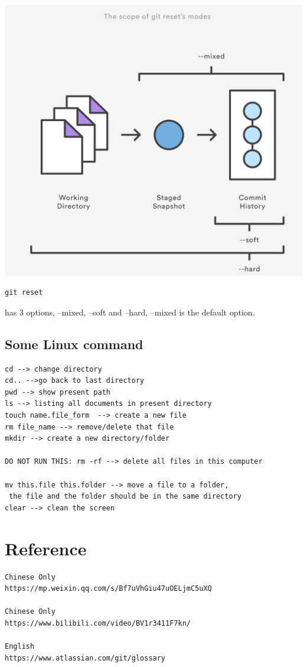 \documentclass[UTF8]{article}
\begin{document}
\begin{center}
\includegraphics[scale=0.3]{gitreset}
\end{center}

\begin{verbatim}
git reset 
\end{verbatim}
has 3 options, --mixed, --soft and --hard, --mixed is the default option. 

\subsection{Some Linux command}
\begin{verbatim}
cd --> change directory
cd.. -->go back to last directory
pwd --> show present path
ls --> listing all documents in present directory
touch name.file_form  --> create a new file 
rm file_name --> remove/delete that file
mkdir --> create a new directory/folder

DO NOT RUN THIS: rm -rf --> delete all files in this computer

mv this.file this.folder --> move a file to a folder,
 the file and the folder should be in the same directory
clear --> clean the screen
\end{verbatim}



\section{Reference}
\begin{verbatim}
Chinese Only
https://mp.weixin.qq.com/s/Bf7uVhGiu47uOELjmC5uXQ 

Chinese Only
https://www.bilibili.com/video/BV1r3411F7kn/

English
https://www.atlassian.com/git/glossary 
\end{verbatim}
\end{document}
